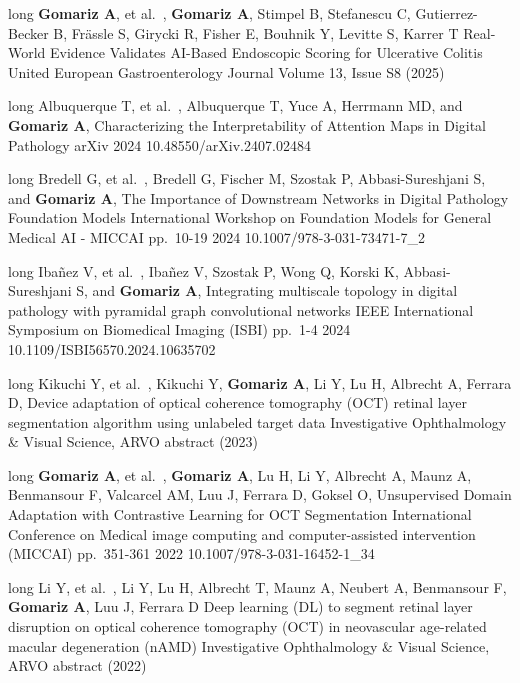 \begin{cvpublications}
\cvpublication
{long}
{
    {\textbf{Gomariz A}, et al.~,}
    {\textbf{Gomariz A}, Stimpel B, Stefanescu C, Gutierrez-Becker B, Fr\"assle S, Girycki R, Fisher E, Bouhnik Y, Levitte S, Karrer T}
}
{Real-World Evidence Validates AI-Based Endoscopic Scoring for Ulcerative Colitis}
{United European Gastroenterology Journal}
{Volume 13, Issue S8 (2025)}
{}
{}

\cvpublication
{long}
{
    {Albuquerque T, et al.~,}
    {Albuquerque T, Yuce A, Herrmann MD, and \textbf{Gomariz A},}
}
{Characterizing the Interpretability of Attention Maps in Digital Pathology}
{arXiv}
{}
{2024}
{10.48550/arXiv.2407.02484}

\cvpublication
{long}
{
    {Bredell G, et al.~,}
    {Bredell G, Fischer M, Szostak P, Abbasi-Sureshjani S, and \textbf{Gomariz A},}
}
{The Importance of Downstream Networks in Digital Pathology Foundation Models}
{International Workshop on Foundation Models for General Medical AI - MICCAI}
{pp.\ 10-19}
{2024}
{10.1007/978-3-031-73471-7\_2}


\cvpublication
{long}
{
    {Ibañez V, et al.~,}
    {Ibañez V, Szostak P, Wong Q, Korski K, Abbasi-Sureshjani S, and \textbf{Gomariz A},}
}
{Integrating multiscale topology in digital pathology with pyramidal graph convolutional networks}
{IEEE International Symposium on Biomedical Imaging (ISBI)}
{pp.\ 1-4}
{2024}
{10.1109/ISBI56570.2024.10635702}

\cvpublication
{long}
{
    {Kikuchi Y, et al.~,}
    {Kikuchi Y, \textbf{Gomariz A}, Li Y, Lu H, Albrecht A, Ferrara D,}
}
{Device adaptation of optical coherence tomography (OCT) retinal layer segmentation algorithm using unlabeled target data}
{Investigative Ophthalmology \& Visual Science, ARVO abstract}
{(2023)}
{}
{}


\cvpublication
{long}
{
    {\textbf{Gomariz A}, et al.~,}
    {\textbf{Gomariz A}, Lu H, Li Y, Albrecht A, Maunz A, Benmansour F, Valcarcel AM, Luu J, Ferrara D, Goksel O,}
}
{Unsupervised Domain Adaptation with Contrastive Learning for OCT Segmentation}
{International Conference on Medical image computing and computer-assisted intervention (MICCAI)}
{pp.\ 351-361}
{2022}
{10.1007/978-3-031-16452-1\_34}

\cvpublication
{long}
{
    {Li Y, et al.~,}
    {Li Y, Lu H, Albrecht T, Maunz A, Neubert A, Benmansour F, \textbf{Gomariz A}, Luu J, Ferrara D}
}
{Deep learning (DL) to segment retinal layer disruption on optical coherence tomography (OCT) in neovascular age-related macular degeneration (nAMD)}
{Investigative Ophthalmology \& Visual Science, ARVO abstract}
{(2022)}
{}
{}



\end{cvpublications}
